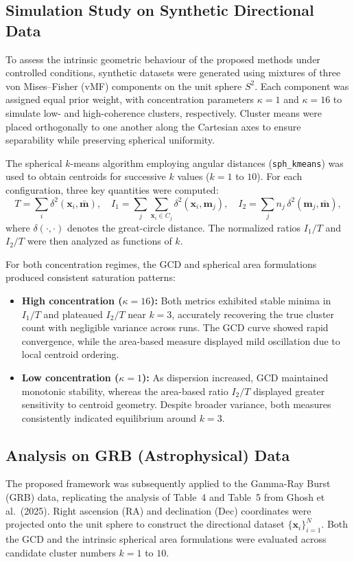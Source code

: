 \documentclass[12pt,a4paper]{report}
\begin{document}
\subsection{Simulation Study on Synthetic Directional Data}
To assess the intrinsic geometric behaviour of the proposed methods under controlled conditions, synthetic datasets were generated using mixtures of three von Mises–Fisher (vMF) components on the unit sphere $S^2$. Each component was assigned equal prior weight, with concentration parameters $\kappa = 1$ and $\kappa = 16$ to simulate low- and high-coherence clusters, respectively.  
Cluster means were placed orthogonally to one another along the Cartesian axes to ensure separability while preserving spherical uniformity.

The spherical $k$-means algorithm employing angular distances (\texttt{sph\_kmeans}) was used to obtain centroids for successive $k$ values ($k = 1$ to $10$). For each configuration, three key quantities were computed:
\begin{equation}
T = \sum_i \delta^2(\mathbf{x}_i, \bar{\mathbf{m}}), \quad
I_1 = \sum_{j}\sum_{\mathbf{x}_i \in C_j} \delta^2(\mathbf{x}_i, \mathbf{m}_j), \quad
I_2 = \sum_j n_j\,\delta^2(\mathbf{m}_j, \bar{\mathbf{m}}),
\end{equation}
where $\delta(\cdot,\cdot)$ denotes the great-circle distance.  
The normalized ratios $I_1/T$ and $I_2/T$ were then analyzed as functions of $k$.

For both concentration regimes, the GCD and spherical area formulations produced consistent saturation patterns:
\begin{itemize}
    \item \textbf{High concentration ($\kappa = 16$):}  
    Both metrics exhibited stable minima in $I_1/T$ and plateaued $I_2/T$ near $k = 3$, accurately recovering the true cluster count with negligible variance across runs.  
    The GCD curve showed rapid convergence, while the area-based measure displayed mild oscillation due to local centroid ordering.

    \item \textbf{Low concentration ($\kappa = 1$):}  
    As dispersion increased, GCD maintained monotonic stability, whereas the area-based ratio $I_2/T$ displayed greater sensitivity to centroid geometry.  
    Despite broader variance, both measures consistently indicated equilibrium around $k = 3$.
\end{itemize}

\subsection{Analysis on GRB (Astrophysical) Data}
The proposed framework was subsequently applied to the Gamma-Ray Burst (GRB) data,
replicating the analysis of Table~4 and Table~5 from Ghosh et al.~(2025). Right ascension (RA)
and declination (Dec) coordinates were projected onto the unit sphere to construct the 
directional dataset $\{\mathbf{x}_i\}_{i=1}^{N}$. Both the GCD and the intrinsic spherical 
area formulations were evaluated across candidate cluster numbers $k = 1$ to $10$.
\end{document}
